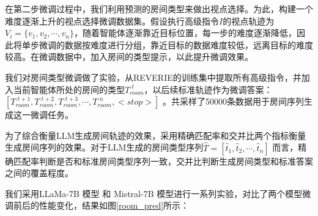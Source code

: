 \documentclass[bachelor]{thesis-uestc}
\begin{document}
在第二步微调过程中，我们利用预测的房间类型来做出视点选择。为此，构建一个难度逐渐上升的视点选择微调数据集。假设执行高级指令$I$的视点轨迹为$V_i=\{v_1,v_2,\cdots,v_n\}$，随着智能体逐渐靠近目标位置，每一步的难度逐渐降低，因此将单步微调的数据按难度进行分组，靠近目标的数据难度较低，远离目标的难度较高。在微调数据中，加入房间的类型提示，以此提升微调效果。

我们对房间类型微调做了实验，从REVERIE的训练集中提取所有高级指令，并加入当前智能体所处的房间的类型$T_{room}^{\,\,t}$，以后续标准轨迹作为微调答案：$[T^{\,\,t+1}_{room},T_{room}^{\,\,t+2},T_{room}^{\,\,t+3},\cdots,T_{room}^{\,\,n},<stop>]$ 。共采样了50000条数据用于房间序列生成这一微调任务。

为了综合衡量LLM生成房间轨迹的效果，采用精确匹配率和交并比两个指标衡量生成房间序列的效果。对于LLM生成的房间类型序列$\hat{T} = [\hat{t}_1,\hat{t}_2,\cdots,\hat{t}_n]$ 而言，精确匹配率判断是否和标准房间类型序列一致，交并比判断生成房间类型和标准答案之间的覆盖程度。

我们采用LLaMa-7B 模型 和 Mistral-7B 模型进行一系列实验，对比了两个模型微调前后的性能变化，结果如图\ref{room_pred}所示：
\end{document}

